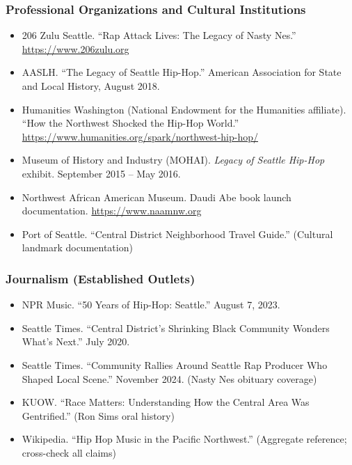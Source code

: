 \documentclass[11pt,letterpaper]{article}
\newcommand{\stageheader}[2]{%
  \noindent\colorbox{#2}{\makebox[\textwidth][l]{%
    \textcolor{white}{\bfseries\sffamily\hspace{6pt}#1\hspace{6pt}}}}%
  \vspace{0.5em}\par%
}
\begin{document}
\subsubsection{Professional Organizations and Cultural Institutions}
\begin{itemize}[noitemsep]
  \item 206 Zulu Seattle. ``Rap Attack Lives: The Legacy of Nasty Nes.'' \url{https://www.206zulu.org}
  \item AASLH. ``The Legacy of Seattle Hip-Hop.'' American Association for State and Local History, August 2018.
  \item Humanities Washington (National Endowment for the Humanities affiliate). ``How the Northwest Shocked the Hip-Hop World.'' \url{https://www.humanities.org/spark/northwest-hip-hop/}
  \item Museum of History and Industry (MOHAI). \textit{Legacy of Seattle Hip-Hop} exhibit. September 2015 -- May 2016.
  \item Northwest African American Museum. Daudi Abe book launch documentation. \url{https://www.naamnw.org}
  \item Port of Seattle. ``Central District Neighborhood Travel Guide.'' (Cultural landmark documentation)
\end{itemize}

\subsubsection{Journalism (Established Outlets)}
\begin{itemize}[noitemsep]
  \item NPR Music. ``50 Years of Hip-Hop: Seattle.'' August 7, 2023.
  \item Seattle Times. ``Central District's Shrinking Black Community Wonders What's Next.'' July 2020.
  \item Seattle Times. ``Community Rallies Around Seattle Rap Producer Who Shaped Local Scene.'' November 2024. (Nasty Nes obituary coverage)
  \item KUOW. ``Race Matters: Understanding How the Central Area Was Gentrified.'' (Ron Sims oral history)
  \item Wikipedia. ``Hip Hop Music in the Pacific Northwest.'' (Aggregate reference; cross-check all claims)
\end{itemize}

\newpage
\stageheader{STAGE 3 --- MISSION PACKAGE}{tertiary}
\end{document}
